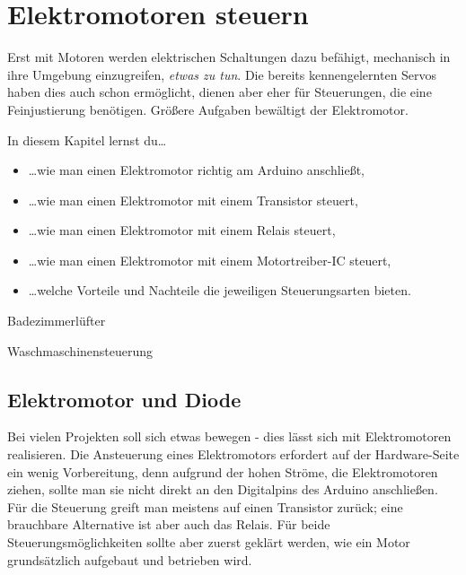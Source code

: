 \chapter{Elektromotoren steuern}\label{kap:elektromotoren}
\label{kap:e-motor}
Erst mit Motoren werden elektrischen Schaltungen dazu befähigt, mechanisch in ihre Umgebung einzugreifen, \emph{etwas zu tun}. Die bereits kennengelernten Servos haben dies auch schon ermöglicht, dienen aber eher für Steuerungen, die eine Feinjustierung benötigen. Größere Aufgaben bewältigt der Elektromotor.

\bigskip
In diesem Kapitel lernst du\dots
\begin{itemize}
	\item \dots wie man einen Elektromotor richtig am Arduino anschließt,
	\item \dots wie man einen Elektromotor mit einem Transistor steuert,
	\item \dots wie man einen Elektromotor mit einem Relais steuert,
	\item \dots wie man einen Elektromotor mit einem Motortreiber-IC steuert,
	\item \dots welche Vorteile und Nachteile die jeweiligen Steuerungsarten bieten.
\end{itemize}

\bigskip

\begin{projektueberblick}
	\item Badezimmerlüfter \dotfill \pageref{proj:badezimmerluefter}
	\item Waschmaschinensteuerung \dotfill \pageref{proj:waschmaschinensteuerung}
\end{projektueberblick}

\newpage
\section{Elektromotor und Diode}

Bei vielen Projekten soll sich etwas bewegen - dies lässt sich mit Elektromotoren realisieren. Die Ansteuerung eines Elektromotors erfordert auf der Hardware-Seite ein wenig Vorbereitung, denn aufgrund der hohen Ströme, die Elektromotoren ziehen, sollte man sie nicht direkt an den Digitalpins des Arduino anschließen. Für die Steuerung greift man meistens auf einen Transistor zurück; eine brauchbare Alternative ist aber auch das Relais. Für beide Steuerungsmöglichkeiten sollte aber zuerst geklärt werden, wie ein Motor grundsätzlich aufgebaut und betrieben wird.

